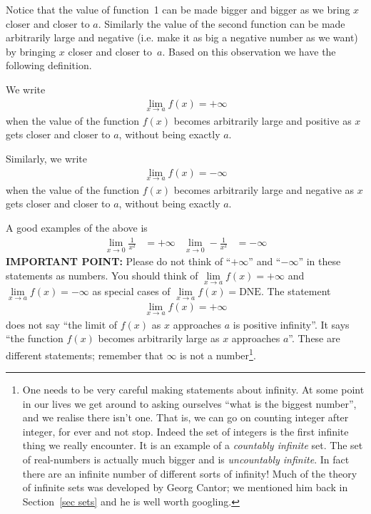 Notice that the value of function~1 can be made bigger and bigger as we bring
$x$ closer and closer to $a$. Similarly the value of the second function can be
made arbitrarily large and negative (i.e. make it as big a negative number as we
want) by bringing $x$ closer and closer to~$a$. Based on this observation we
have the following definition.
\begin{defn}
\label{def lim is inf informal}
  We write
 \begin{align*}
  \lim_{x \to a} f(x) = + \infty
 \end{align*}
  when the value of the function $f(x)$ becomes arbitrarily large and
  positive as $x$ gets closer and closer to $a$, without being exactly $a$.

  Similarly, we write
 \begin{align*}
  \lim_{x \to a} f(x) = - \infty
 \end{align*}
  when the value of the function $f(x)$ becomes arbitrarily large and
  negative as $x$ gets closer and closer to $a$, without being exactly $a$.
\end{defn}
A good examples of the above is
\begin{align*}
  \lim_{x \to 0} \frac{1}{x^2} &= +\infty
  & \lim_{x \to 0} -\frac{1}{x^2} &= -\infty
\end{align*}
\textbf{IMPORTANT POINT: } Please do not think of ``$+\infty$'' and ``$-\infty$''
in these statements as numbers. You should think of $\lim\limits_{x\rightarrow a} f(x) = +\infty$ and $\lim\limits_{x\rightarrow a} f(x) = -\infty$
as special cases of  $\lim\limits_{x\rightarrow a} f(x) = \text{DNE}$. The statement
\begin{align*}
  \lim_{x \to a} f(x) = +\infty
\end{align*}
does not say ``the limit of $f(x)$ as $x$ approaches $a$ is positive infinity''.
It says ``the function $f(x)$ becomes arbitrarily large as $x$ approaches $a$''.
These are different statements; remember that $\infty$ is not a
number\footnote{One needs to be very careful making statements about
infinity. At some point in our lives we get around to asking ourselves ``what
is the biggest number'', and we realise there isn't one. That is, we can go on
counting integer after integer, for ever and not stop. Indeed the set of
integers is the first infinite thing we really encounter. It is an example of a
\emph{countably infinite} set. The set of real-numbers is actually much bigger
and is \emph{uncountably infinite}. In fact there are an infinite number of
different sorts of infinity! Much of the theory of infinite sets was
developed by Georg Cantor; we mentioned him back in Section~\ref{sec sets} and he is well
worth googling.}.



